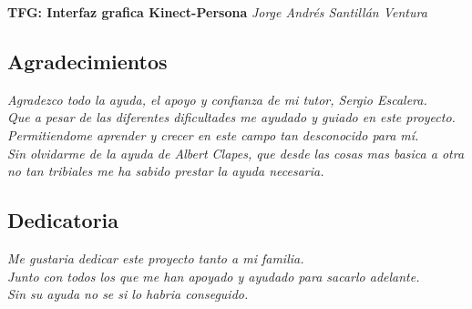 \emph{ }


\vspace{20mm}
\textbf{\huge{TFG: Interfaz grafica Kinect-Persona}}
\vspace{5mm}
\textit{\huge{Jorge Andrés Santillán Ventura}}

\newpage

\begin{flushright}
\chapter*{Agradecimientos}
\textit{Agradezco todo la ayuda, el apoyo y confianza de mi tutor, Sergio Escalera.\\ Que a pesar de las diferentes dificultades me ayudado y guiado en este proyecto.\\
Permitiendome aprender y crecer en este campo tan desconocido para mí.\\ Sin olvidarme de la ayuda de Albert Clapes, que desde las cosas mas basica a otra no tan tribiales me ha sabido prestar la ayuda necesaria.\\}
\end{flushright}

\newpage

\begin{flushright}
\chapter*{Dedicatoria}
\textit{Me gustaria dedicar este proyecto tanto a mi familia.\\
Junto con todos los que me han apoyado y ayudado para sacarlo adelante.\\
Sin su ayuda no se si lo habria conseguido.\\}
\end{flushright}

\cleardoublepage

